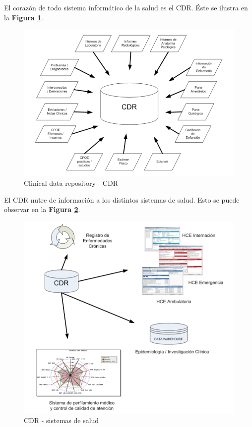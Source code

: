 El corazón de todo sistema informático de la salud es el CDR. Éste se ilustra en la \textbf{Figura \ref{cdr}}.

\begin{figure}
  \centering
  \includegraphics[width=.9\textwidth]{img/tp1/CDR}
  \caption{Clinical data repository - CDR} 
  \label{cdr}
\end{figure}

El CDR nutre de información a los distintos sistemas de salud. Esto se puede observar en la \textbf{Figura \ref{cdr-hce}}.
\begin{figure}
  \centering
  \includegraphics[width=.9\textwidth]{img/tp1/CDR-HCE}
  \caption{CDR - sistemas de salud} 
  \label{cdr-hce}
\end{figure}
\clearpage

